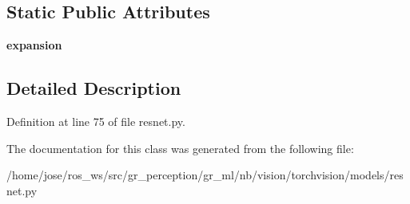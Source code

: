 \subsection*{Static Public Attributes}
\begin{DoxyCompactItemize}
\item 
\mbox{\label{classtorchvision_1_1models_1_1resnet_1_1Bottleneck_af4cba79aab4deffa1e3530e0fa1db350}} 
{\bfseries expansion}
\end{DoxyCompactItemize}


\subsection{Detailed Description}


Definition at line 75 of file resnet.\+py.



The documentation for this class was generated from the following file\+:\begin{DoxyCompactItemize}
\item 
/home/jose/ros\+\_\+ws/src/gr\+\_\+perception/gr\+\_\+ml/nb/vision/torchvision/models/resnet.\+py\end{DoxyCompactItemize}
